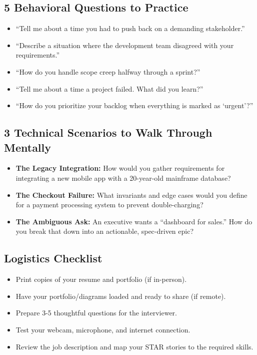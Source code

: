 \subsection{5 Behavioral Questions to
Practice}\label{behavioral-questions-to-practice}

\begin{itemize}
\tightlist
\item
  ``Tell me about a time you had to push back on a demanding
  stakeholder.''
\item
  ``Describe a situation where the development team disagreed with your
  requirements.''
\item
  ``How do you handle scope creep halfway through a sprint?''
\item
  ``Tell me about a time a project failed. What did you learn?''
\item
  ``How do you prioritize your backlog when everything is marked as
  `urgent'?''
\end{itemize}

\subsection{3 Technical Scenarios to Walk Through
Mentally}\label{technical-scenarios-to-walk-through-mentally}

\begin{itemize}
\tightlist
\item
  \textbf{The Legacy Integration:} How would you gather requirements for
  integrating a new mobile app with a 20-year-old mainframe database?
\item
  \textbf{The Checkout Failure:} What invariants and edge cases would
  you define for a payment processing system to prevent double-charging?
\item
  \textbf{The Ambiguous Ask:} An executive wants a ``dashboard for
  sales.'' How do you break that down into an actionable, spec-driven
  epic?
\end{itemize}

\subsection{Logistics Checklist}\label{logistics-checklist}

\begin{itemize}
\tightlist
\item
  Print copies of your resume and portfolio (if in-person).
\item
  Have your portfolio/diagrams loaded and ready to share (if remote).
\item
  Prepare 3-5 thoughtful questions for the interviewer.
\item
  Test your webcam, microphone, and internet connection.
\item
  Review the job description and map your STAR stories to the required
  skills.
\end{itemize}

